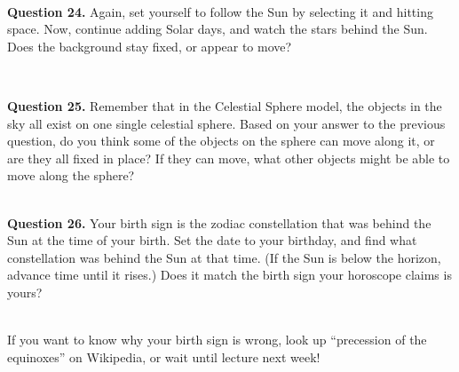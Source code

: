\documentclass[11pt]{article}
\begin{document}
\hrulefill\\

\textbf{Question 24.} Again, set yourself to follow the Sun by selecting it and hitting space. Now, continue adding Solar days, and watch the stars behind the Sun. Does the background stay fixed, or appear to move? \\
\vspace*{1.5cm}

\hrulefill\\

\newpage

\textbf{Question 25.} Remember that in the Celestial Sphere model, the objects in the sky all exist on one single celestial sphere. Based on your answer to the previous question, do you think some of the objects on the sphere can move along it, or are they all fixed in place? If they can move, what other objects might be able to move along the sphere? \\
\vspace*{1.5cm}

\hrulefill\\

\textbf{Question 26.} Your birth sign is the zodiac constellation that was behind the Sun at the time of your birth. Set the date to your birthday, and find what constellation was behind the Sun at that time. (If the Sun is below the horizon, advance time until it rises.) Does it match the birth sign your horoscope claims is yours?\\
\vspace*{1.5cm}

\hrulefill\\
If you want to know why your birth sign is wrong, look up ``precession of the equinoxes'' on Wikipedia, or wait until lecture next week!
\end{document}
